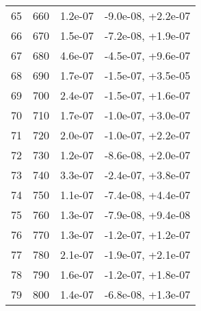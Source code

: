 \begin{table}
\begin{adjustbox}{width=1\textwidth/2}
\begin{tabular}{|c|c|c|c|}
\cline{1-4}
65 & 660 & 1.2e-07 & -9.0e-08, +2.2e-07 \\
\cline{1-4}
66 & 670 & 1.5e-07 & -7.2e-08, +1.9e-07 \\
\cline{1-4}
67 & 680 & 4.6e-07 & -4.5e-07, +9.6e-07 \\
\cline{1-4}
68 & 690 & 1.7e-07 & -1.5e-07, +3.5e-05 \\
\cline{1-4}
69 & 700 & 2.4e-07 & -1.5e-07, +1.6e-07 \\
\cline{1-4}
70 & 710 & 1.7e-07 & -1.0e-07, +3.0e-07 \\
\cline{1-4}
71 & 720 & 2.0e-07 & -1.0e-07, +2.2e-07 \\
\cline{1-4}
72 & 730 & 1.2e-07 & -8.6e-08, +2.0e-07 \\
\cline{1-4}
73 & 740 & 3.3e-07 & -2.4e-07, +3.8e-07 \\
\cline{1-4}
74 & 750 & 1.1e-07 & -7.4e-08, +4.4e-07 \\
\cline{1-4}
75 & 760 & 1.3e-07 & -7.9e-08, +9.4e-08 \\
\cline{1-4}
76 & 770 & 1.3e-07 & -1.2e-07, +1.2e-07 \\
\cline{1-4}
77 & 780 & 2.1e-07 & -1.9e-07, +2.1e-07 \\
\cline{1-4}
78 & 790 & 1.6e-07 & -1.2e-07, +1.8e-07 \\
\cline{1-4}
79 & 800 & 1.4e-07 & -6.8e-08, +1.3e-07 \\
\cline{1-4}
\end{tabular}
\end{adjustbox}
\end{table}

